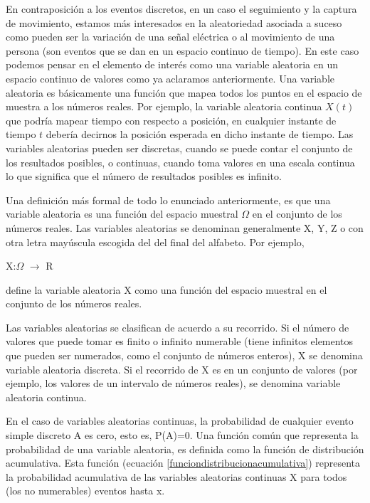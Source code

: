 En contraposición a los eventos discretos, en un caso el seguimiento y la captura de movimiento, estamos más interesados en la aleatoriedad asociada a suceso como pueden ser la variación de una señal eléctrica o al movimiento de una persona (son eventos que se dan en un espacio continuo de tiempo).
En este caso podemos pensar en el elemento de interés como una variable aleatoria en un espacio continuo de valores como ya aclaramos anteriormente.
Una variable aleatoria es básicamente una función que mapea todos los puntos en el espacio de muestra a los números reales. 
Por ejemplo, la variable aleatoria continua $X(t)$ que podría mapear tiempo con respecto a posición, en cualquier instante de tiempo $t$ debería decirnos la posición esperada en dicho instante de tiempo.
Las variables aleatorias pueden ser discretas, cuando se puede contar el conjunto de los resultados posibles, o continuas, cuando toma valores en una escala continua lo que significa que el número de resultados posibles es infinito.

Una definición más formal de todo lo enunciado anteriormente, es que una variable aleatoria es una función del espacio muestral $\Omega$ en el conjunto de los números reales.
Las variables aleatorias se denominan generalmente X, Y, Z o con otra letra mayúscula escogida del del final del alfabeto. Por ejemplo, 

\begin{center}
\centering
X:$\Omega$ $\to$ R
\end{center}

define la variable aleatoria X como una función del espacio muestral en el conjunto de los números reales.

Las variables aleatorias se clasifican de acuerdo a su recorrido.
Si el número de valores que puede tomar es finito o infinito numerable (tiene infinitos elementos que pueden ser numerados, como el conjunto de números enteros), X se denomina variable aleatoria discreta. 
Si el recorrido de X es en un conjunto de valores (por ejemplo, los valores de un intervalo de números reales), se denomina variable aleatoria continua.

En el caso de variables aleatorias continuas, la probabilidad de cualquier evento simple discreto A es cero, esto es, P(A)=0.
Una función común que representa la probabilidad de una variable aleatoria, es definida como la función de distribución acumulativa.
Esta función (ecuación \ref{funciondistribucionacumulativa}) representa la probabilidad acumulativa de las variables aleatorias continuas X para todos (los no numerables) eventos hasta x.

